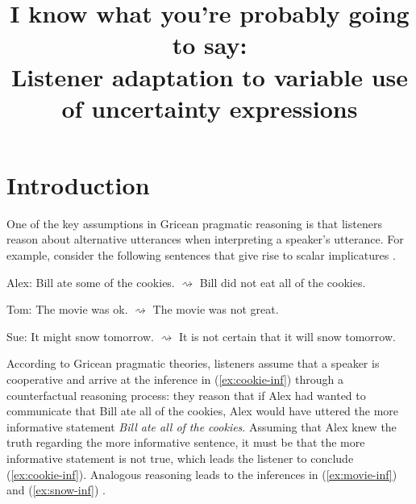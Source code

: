 \documentclass[lucida,biblatex]{sp} %
\title{I know what you're probably going to say: \\ Listener adaptation to variable use of uncertainty expressions}
\author{%
  \spauthor{Sebastian Schuster and Judith Degen\\ \today}
}
\begin{document}

\maketitle





\section{Introduction}


One of the key assumptions in Gricean pragmatic reasoning \citep{Grice1975} is that listeners reason about alternative utterances when interpreting a speaker's utterance. For example, consider the following sentences that give rise to scalar implicatures \citep{Horn1984}.

\begin{exe}
  \ex 
  \begin{xlist}
    \ex Alex: Bill ate some of the cookies.
    \ex \label{ex:cookie-inf} $\rightsquigarrow$ Bill did not eat all of the cookies.
  \end{xlist}
  \ex 
  \begin{xlist} 
    \ex Tom: The movie was ok.
    \ex \label{ex:movie-inf} $\rightsquigarrow$  The movie was not great.
  \end{xlist}
  \ex 
  \begin{xlist} 
    \ex Sue: It might snow tomorrow.
    \ex \label{ex:snow-inf} $\rightsquigarrow$  It is not certain that it will snow tomorrow.
  \end{xlist}
\end{exe}
According to Gricean pragmatic theories, listeners assume that a speaker is cooperative and arrive at the inference in (\ref{ex:cookie-inf}) through a counterfactual reasoning process: they reason that if Alex had wanted to communicate that Bill ate all of the cookies, Alex would have uttered the more informative statement \textit{Bill ate all of the cookies}. Assuming that Alex knew the truth regarding the more informative sentence, it must be that the more informative statement is not true, which leads the listener to conclude (\ref{ex:cookie-inf}). Analogous reasoning leads to the inferences in (\ref{ex:movie-inf})  and (\ref{ex:snow-inf}) .
\end{document}
